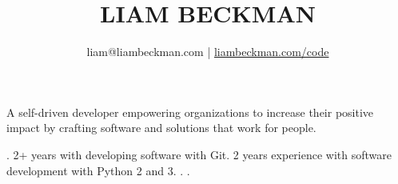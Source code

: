 


\title{\textcolor{my-red}{LIAM BECKMAN}}
\author{liam@liambeckman.com | \href{https://liambeckman.com/code}{liambeckman.com/code}}

\date{\vspace{-5ex}}



\maketitle

\begin{center}
A self-driven developer empowering organizations to increase their positive impact by crafting software and solutions that work for people.
\end{center}





\vspace{-1em}
\begin{itemize}[label=$\triangleright$]
    .
    2+ years with developing software with Git.
    2 years experience with software development with Python 2 and 3.
    .
    .

\end{itemize}

\medbreak









\vfill




